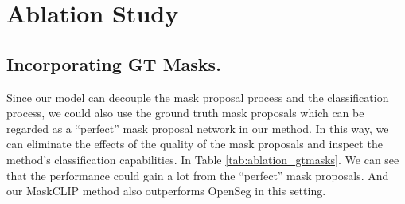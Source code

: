 \documentclass{article}
\theoremstyle{plain}
\theoremstyle{definition}
\theoremstyle{remark}
\begin{document}
\begin{table}[H]
\centering
\caption{\textbf{FLOPs Comparison.} We use the CLIP ViT-L/14 model in all methods for fair comparison and 640x640 as the input resolution.}
\label{tab:flops}
\end{table}

\section{Ablation Study} 

\subsection{Incorporating GT Masks.}

Since our model can decouple the mask proposal process and the classification process, we could also use the ground truth mask proposals which can be regarded as a ``perfect'' mask proposal network in our method. In this way, we can eliminate the effects of the quality of the mask proposals and inspect the method's classification capabilities.  In Table \ref{tab:ablation_gtmasks}. We can see that the performance could gain a lot from the ``perfect'' mask proposals. And our MaskCLIP method also outperforms OpenSeg in this setting.


\begin{table}[H]
\centering
\caption{\textbf{Incorporating GT Masks.} Results on using GT masks as mask proposals for open-vocabulary panoptic segmentation and semantic segmentation.}
\label{tab:ablation_gtmasks}
\end{table}
\end{document}
